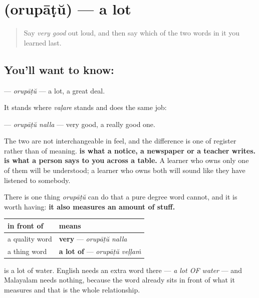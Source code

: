 \section[\texorpdfstring{\ml{ഒരുപാട്} (orupāṭŭ)}{ഒരുപാട് (orupāṭŭ)}]{ (orupāṭŭ) — a lot}

\label{lesson:ML-C79-orupadu}



\begin{quote}
Say \emph{very good} out loud, and then say which of the two words in it you learned last.
\end{quote}

\subsection*{You'll want to know: }
\textbf{} — \emph{orupāṭŭ} — a lot, a great deal.

It stands where \emph{vaḷare} stands and does the same job:

\textbf{ } — \emph{orupāṭŭ nalla} — very good, a really good one.

The two are not interchangeable in feel, and the difference is one of register rather than of meaning. \textbf{ is what a notice, a newspaper or a teacher writes.} \textbf{ is what a person says to you across a table.} A learner who owns only one of them will be understood; a learner who owns both will sound like they have listened to somebody.

There is one thing \emph{orupāṭŭ} can do that a pure degree word cannot, and it is worth having: \textbf{it also measures an amount of stuff.}

\noindent
\begin{tabularx}{\linewidth}{@{}>{\raggedright\arraybackslash}X>{\raggedright\arraybackslash}X@{}}
\toprule
\textbf{in front of} & \textbf{means} \\
\midrule
a quality word & \textbf{very} — \emph{orupāṭŭ nalla} \\
a thing word & \textbf{a lot of} — \emph{orupāṭŭ veḷḷaṁ} \\
\bottomrule
\end{tabularx}

\textbf{ } is a lot of water. English needs an extra word there — \emph{a lot OF water} — and Malayalam needs nothing, because the word already sits in front of what it measures and that is the whole relationship.

